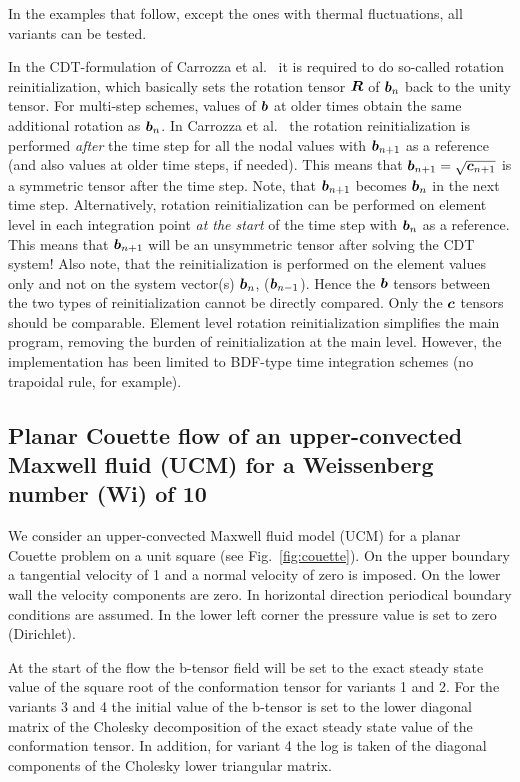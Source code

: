 In the examples that follow, except the ones with thermal fluctuations, all variants can be tested.

In the CDT-formulation of Carrozza et al.\ \cite{carrozza_viscoelastic_2019} it is required to do so-called rotation reinitialization, which basically sets the rotation tensor $\boldsymbol{R}$ of $\boldsymbol{b}_n$ back to the unity tensor. For multi-step schemes, values of $\boldsymbol{b}$ at older times obtain the same additional rotation as $\boldsymbol{b}_n$. In Carrozza et al.\ \cite{carrozza_viscoelastic_2019} the rotation reinitialization is performed \emph{after} the time step for all the nodal values with $\boldsymbol{b}_{n+1}$ as a reference (and also values at older time steps, if needed). This means that $\boldsymbol{b}_{n+1}=\sqrt{\boldsymbol{c}_{n+1}}$ is a symmetric tensor after the time step. Note, that $\boldsymbol{b}_{n+1}$ becomes $\boldsymbol{b}_n$ in the next time step. Alternatively, rotation reinitialization can be performed on element level in each integration point \emph{at the start} of the time step with $\boldsymbol{b}_n$ as a reference. This means that $\boldsymbol{b}_{n+1}$ will be an unsymmetric tensor after solving the CDT system! Also note, that the reinitialization is performed on the element values only and not on the system vector(s) $\boldsymbol{b}_n$, ($\boldsymbol{b}_{n-1}$). Hence the $\boldsymbol{b}$ tensors between the two types of reinitialization cannot be directly compared. Only the $\boldsymbol{c}$ tensors should be comparable.
Element level rotation reinitialization simplifies the main program, removing the burden of reinitialization at the main level. However, the implementation has been limited to BDF-type time integration schemes (no trapoidal rule, for example).

\subsection{Planar Couette flow of an upper-convected Maxwell fluid (UCM) for a
 Weissenberg number (Wi) of 10}
\label{sec:couette_b}

We consider an upper-convected Maxwell fluid model (UCM) for a planar Couette problem on a unit square
(see Fig.~\ref{fig:couette}). On the upper boundary a tangential
velocity of 1 and a normal velocity of zero is imposed.
On the lower wall the velocity components are
zero. In horizontal direction periodical boundary conditions are assumed.
In the lower left corner the pressure value is set to zero (Dirichlet).

At the start of the flow the b-tensor field will be set to the exact steady state value
of the square root of the conformation tensor for variants 1 and 2. For the variants 3 and 4 the initial value of the b-tensor is set to the lower diagonal matrix of the Cholesky decomposition 
of the exact steady state value of the conformation tensor. In addition, for variant 4 the log is taken of the diagonal components of the Cholesky lower triangular matrix.

